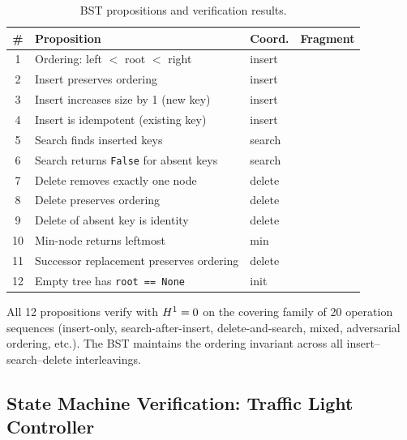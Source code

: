 \begin{table}[H]
\centering
\caption{BST propositions and verification results.}
\label{tab:bst-props}
\begin{tabular}{@{}clll@{}}
\toprule
\textbf{\#} & \textbf{Proposition} & \textbf{Coord.} & \textbf{Fragment} \\
\midrule
1  & Ordering: left $<$ root $<$ right       & insert & \QFLIA{} \\
2  & Insert preserves ordering                & insert & \QFLIA{} \\
3  & Insert increases size by 1 (new key)     & insert & \QFLIA{} \\
4  & Insert is idempotent (existing key)      & insert & \QFUF{} \\
5  & Search finds inserted keys               & search & \QFUF{} \\
6  & Search returns \texttt{False} for absent keys & search & \QFUF{} \\
7  & Delete removes exactly one node          & delete & \QFLIA{} \\
8  & Delete preserves ordering                & delete & \QFLIA{} \\
9  & Delete of absent key is identity         & delete & \QFUF{} \\
10 & Min-node returns leftmost                & min    & \QFLIA{} \\
11 & Successor replacement preserves ordering & delete & \QFLIA{} \\
12 & Empty tree has \texttt{root == None}     & init   & \QFUF{} \\
\bottomrule
\end{tabular}
\end{table}

\begin{theorem}\label{thm:bst}
All 12 propositions verify with $H^{1} = 0$ on the covering family
of 20 operation sequences (insert-only, search-after-insert,
delete-and-search, mixed, adversarial ordering, etc.).
The BST maintains the ordering invariant across all
insert--search--delete interleavings.
\end{theorem}


\subsection{State Machine Verification: Traffic Light Controller}%
\label{sec:app-traffic}


